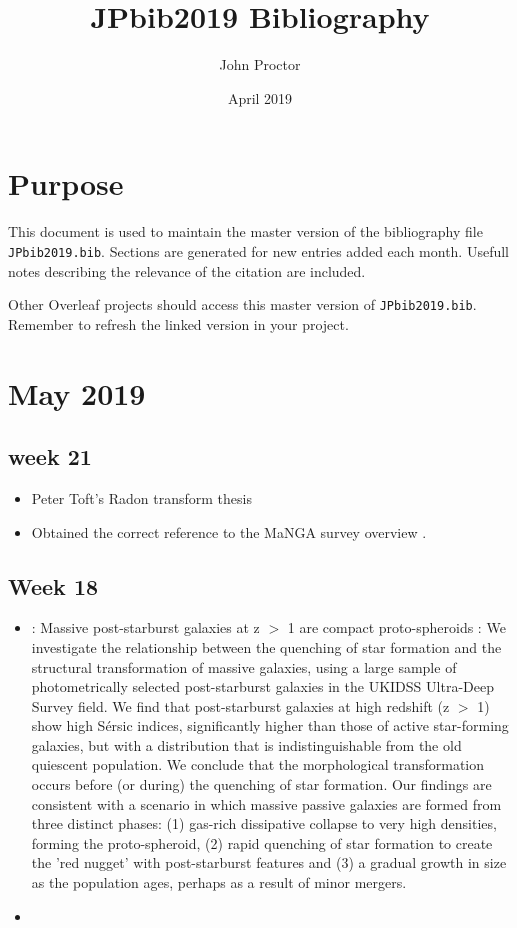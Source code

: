 \documentclass[ceqn,usenatbib,onecolumn]{mnras}
\title{JPbib2019 Bibliography}
\author{John Proctor}
\date{April 2019}
\begin{document}
\maketitle

\section{Purpose}
This document is used to maintain the master version of the bibliography file \texttt{JPbib2019.bib}. Sections are generated for new entries added each month. Usefull notes describing the relevance of the citation are included.
\par Other Overleaf projects should access this master version of \texttt{JPbib2019.bib}. Remember to refresh the linked version in your project.

\section{May 2019}
\subsection{week 21}
\begin{itemize}
    \item Peter Toft's Radon transform thesis \citet{7910dc8d5b654c90ac4bc94c67d06f01}
    \item Obtained the correct reference to the MaNGA survey overview \citet{2015ApJ...798....7B}.
\end{itemize}


\subsection{Week 18}
\begin{itemize}
    \item \citet{2017MNRAS.472.1401A} : {Massive post-starburst galaxies at z $>$ 1 are compact proto-spheroids} : We investigate the relationship between the quenching of star formation and the structural transformation of massive galaxies, using a large sample of photometrically selected post-starburst galaxies in the UKIDSS Ultra-Deep Survey field. We find that post-starburst galaxies at high redshift (z $>$ 1) show high Sérsic indices, significantly higher than those of active star-forming galaxies, but with a distribution that is indistinguishable from the old quiescent population. We conclude that the morphological transformation occurs before (or during) the quenching of star formation.  Our findings are consistent with a scenario in which massive passive galaxies are formed from three distinct phases: (1) gas-rich dissipative collapse to very high densities, forming the proto-spheroid, (2) rapid quenching of star formation to create the 'red nugget' with post-starburst features and (3) a gradual growth in size as the population ages, perhaps as a result of minor mergers.
    \item 
\end{itemize}
\end{document}
